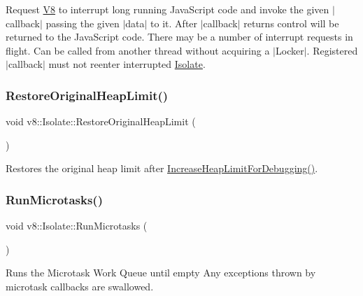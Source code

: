Request \mbox{\hyperlink{classv8_1_1V8}{V8}} to interrupt long running Java\+Script code and invoke the given $\vert$callback$\vert$ passing the given $\vert$data$\vert$ to it. After $\vert$callback$\vert$ returns control will be returned to the Java\+Script code. There may be a number of interrupt requests in flight. Can be called from another thread without acquiring a $\vert$\+Locker$\vert$. Registered $\vert$callback$\vert$ must not reenter interrupted \mbox{\hyperlink{classv8_1_1Isolate}{Isolate}}. \mbox{\label{classv8_1_1Isolate_abb10c6229576e34ae1e8ca1d4d65312e}} 
\subsubsection{\texorpdfstring{Restore\+Original\+Heap\+Limit()}{RestoreOriginalHeapLimit()}}
{\footnotesize\ttfamily void v8\+::\+Isolate\+::\+Restore\+Original\+Heap\+Limit (\begin{DoxyParamCaption}{ }\end{DoxyParamCaption})}

Restores the original heap limit after \mbox{\hyperlink{classv8_1_1Isolate_a72cccea72b0a24af320542bbd5919043}{Increase\+Heap\+Limit\+For\+Debugging()}}. \mbox{\label{classv8_1_1Isolate_ac3cbe2a1632eb863912640dcfc98b6c8}} 
\subsubsection{\texorpdfstring{Run\+Microtasks()}{RunMicrotasks()}}
{\footnotesize\ttfamily void v8\+::\+Isolate\+::\+Run\+Microtasks (\begin{DoxyParamCaption}{ }\end{DoxyParamCaption})}

Runs the Microtask Work Queue until empty Any exceptions thrown by microtask callbacks are swallowed. \mbox{\label{classv8_1_1Isolate_aa3d534382a9d1c562b1967e57dabd7f8}} 

